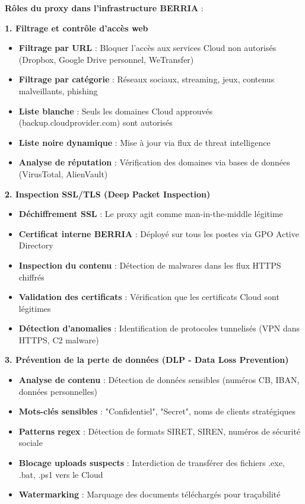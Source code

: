 \medskip

\noindent \textbf{Rôles du proxy dans l'infrastructure BERRIA} :

\medskip

\noindent \textbf{1. Filtrage et contrôle d'accès web}
\begin{itemize}
  \item \textbf{Filtrage par URL} : Bloquer l'accès aux services Cloud non autorisés (Dropbox, Google Drive personnel, WeTransfer)
  \item \textbf{Filtrage par catégorie} : Réseaux sociaux, streaming, jeux, contenus malveillants, phishing
  \item \textbf{Liste blanche} : Seuls les domaines Cloud approuvés (backup.cloudprovider.com) sont autorisés
  \item \textbf{Liste noire dynamique} : Mise à jour via flux de threat intelligence
  \item \textbf{Analyse de réputation} : Vérification des domaines via bases de données (VirusTotal, AlienVault)
\end{itemize}

\medskip

\noindent \textbf{2. Inspection SSL/TLS (Deep Packet Inspection)}
\begin{itemize}
  \item \textbf{Déchiffrement SSL} : Le proxy agit comme man-in-the-middle légitime
  \item \textbf{Certificat interne BERRIA} : Déployé sur tous les postes via GPO Active Directory
  \item \textbf{Inspection du contenu} : Détection de malwares dans les flux HTTPS chiffrés
  \item \textbf{Validation des certificats} : Vérification que les certificats Cloud sont légitimes
  \item \textbf{Détection d'anomalies} : Identification de protocoles tunnelisés (VPN dans HTTPS, C2 malware)
\end{itemize}

\medskip

\noindent \textbf{3. Prévention de la perte de données (DLP - Data Loss Prevention)}
\begin{itemize}
  \item \textbf{Analyse de contenu} : Détection de données sensibles (numéros CB, IBAN, données personnelles)
  \item \textbf{Mots-clés sensibles} : "Confidentiel", "Secret", noms de clients stratégiques
  \item \textbf{Patterns regex} : Détection de formats SIRET, SIREN, numéros de sécurité sociale
  \item \textbf{Blocage uploads suspects} : Interdiction de transférer des fichiers .exe, .bat, .ps1 vers le Cloud
  \item \textbf{Watermarking} : Marquage des documents téléchargés pour traçabilité
\end{itemize}

